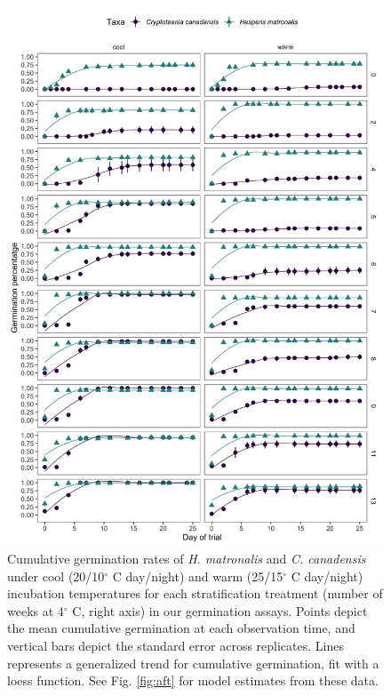 \documentclass{article}[11pt]
\begin{document}
\begin{figure}[h!]
    \centering
\includegraphics[width=.75\textwidth]{..//figure/crp_hesp2.jpeg}
\caption{Cumulative germination rates of \textit{H. matronalis} and \textit{C. canadensis} under cool (20/10$^{\circ}$ C day/night) and warm (25/15$^{\circ}$ C day/night) incubation temperatures for each stratification treatment (number of weeks at 4$^{\circ}$ C, right axis) in our germination assays. Points depict the mean cumulative germination at each observation time, and vertical bars depict the standard error across replicates. Lines represents a generalized trend for cumulative germination, fit with a loess function. See Fig. \ref{fig:aft} for model estimates from these data.}
   \label{fig:timecourse}
\end{figure}
\end{document}
